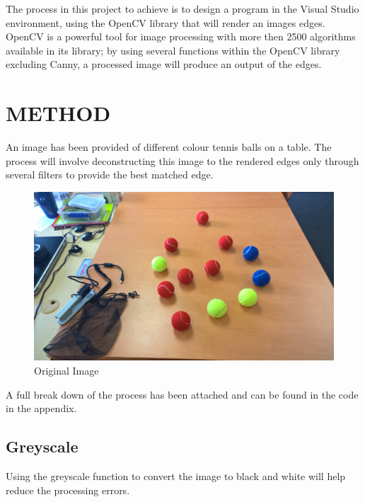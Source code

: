 \documentclass[a4paper, 10pt]{article}
\begin{document}
The process in this project to achieve is to design a program in the Visual Studio environment, using the OpenCV library that will render an images edges. OpenCV is a powerful tool for image processing with more then 2500 algorithms available in its library; by using several functions within the OpenCV library excluding Canny, a processed image will produce an output of the edges. 


\section{METHOD}

An image has been provided of different colour tennis balls on a table. The process will involve deconstructing this image to the rendered edges only through several filters to provide the best matched edge.

\begin{figure}[H]
  \includegraphics[width=\linewidth]{images/Image_1}
  \caption{Original Image}
  \label{fig:Original Image}
\end{figure}

A full break down of the process has been attached and can be found in the code in the appendix.

\clearpage
\subsection{Greyscale}

Using the greyscale function to convert the image to black and white will help reduce the processing errors.
\end{document}
